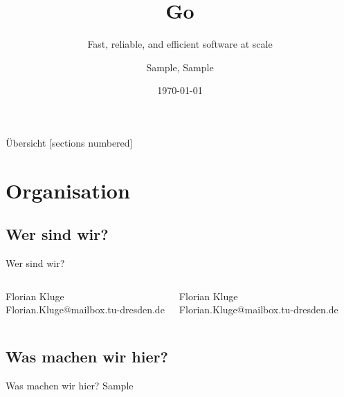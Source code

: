 

\usepackage{tikz}
\usepackage{hyperref}
\hypersetup{
	colorlinks=true,
	linkcolor=darkgray,
	urlcolor=blue,
}


\title{Go}
\subtitle{Fast, reliable, and efficient software at scale}
\date{\today}
\author{Sample, Sample}


\maketitle


\begin{frame}{Übersicht}
	[sections numbered]
	\tableofcontents[hideallsubsections]
\end{frame}



\section{Organisation}

\subsection{Wer sind wir?}
\begin{frame}{Wer sind wir?}

	\begin{columns}
		Florian Kluge\\
		Florian.Kluge@mailbox.tu-dresden.de



		Florian Kluge\\
		Florian.Kluge@mailbox.tu-dresden.de

	\end{columns}

\end{frame}

\subsection{Was machen wir hier?}
\begin{frame}{Was machen wir hier?}
	Sample
\end{frame}



